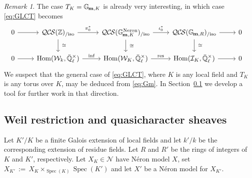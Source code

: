 \documentclass[10pt]{amsart}
\theoremstyle{plain}
\theoremstyle{definition}
\theoremstyle{remark}
\newtheorem{remark}[theorem]{Remark}
\newcommand{\ZZ}{{\mathbb{Z}}}
\newcommand{\NN}{{\mathbb{N}}}
\newcommand{\EE}{\mathbb{\bar Q}_\ell}
\newcommand{\bFq}{\bar{k}}
\newcommand{\Fq}{k}
\newcommand{\EEx}{\EE^\times}
\newcommand{\Weil}[1]{\mathcal{W}_{#1}}
\newcommand{\Gm}[1]{\mathbb{G}_{\hskip-1pt\textbf{m},#1}}
\DeclareMathOperator{\Hom}{Hom}
\DeclareMathOperator{\Gr}{Gr}
\newcommand{\Spec}[1]{{\operatorname{Spec}(#1)}}
\newcommand{\ceq}{{\, :=\, }}
\newcommand{\iso}{{\ \cong\ }}
\newcommand{\QCS}{{\mathcal{QC\hskip-0.8pt S}}}
\newcommand{\QCSiso}[1]{\QCS(#1)_{/\text{iso}}}
\begin{document}
\begin{remark}
The case $T_K = \Gm{K}$ is already very interesting, in which case \eqref{eq:GLCT} becomes
\begin{equation}\label{eq:Gm}
\begin{tikzcd}
    0 \rar & \QCSiso{\ZZ} \arrow{r}{\pi_0^*} \arrow{d}{\iso}
    & \QCSiso{\Gm{K}^\text{Neron}} \arrow{r}{\iota_0^*}  \arrow{d}{\iso} & \QCSiso{\Gm{R}} \arrow{r} \arrow{d}{\iso} & 0\\
    0 \arrow{r}  
 & \Hom(\Weil{\Fq}, \EEx) \arrow{r}{\text{inf}}
 & \Hom(\Weil{K}, \EEx) \arrow{r}{\text{res}} 
 & \Hom(\mathcal{I}_K, \EEx) \arrow{r}  
 & 0
\end{tikzcd}
\end{equation}
We suspect that the general case of \eqref{eq:GLCT}, where $K$ is any local field and $T_K$ is any torus over $K$, may be deduced from \eqref{eq:Gm}.
In Section~\ref{ssec:wrK} we develop a tool for further work in that direction.
\end{remark}


\subsection{Weil restriction and quasicharacter sheaves}\label{ssec:wrK}

Let $K'/K$ be a finite Galois extension of local fields and
let $k'/k$ be the corresponding extension of residue fields.
Let $R$ and $R'$ be the rings of integers of $K$ and $K'$, respectively.
Let $X_K \in \mathcal{N}$ have N\'eron model $X$, set $X_{K'} \ceq X_K \times_\Spec{K} \Spec{K'}$
and let $X'$ be a N\'eron model for $X_{K'}$.
\end{document}
